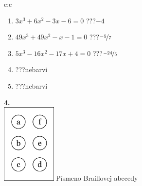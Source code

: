 \documentclass[10pt]{report}
\begin{document}
\begin{tabular}{c:c}
\begin{minipage}[c][104.5mm][t]{0.5\linewidth}
\begin{center}
\begin{minipage}{0.79\linewidth}
\begin{center}
\begin{varwidth}{\linewidth}
\begin{enumerate}
\item $3x^3+6x^2-3x-6=0$\quad \dotfill\; ???\;\dotfill \quad $-4$
\item $49x^3+49x^2-x-1=0$\quad \dotfill\; ???\;\dotfill \quad $\nicefrac{-5}{7}$
\item $5x^3-16x^2-17x+4=0$\quad \dotfill\; ???\;\dotfill \quad $\nicefrac{-24}{5}$
\item \quad \dotfill\; ???\;\dotfill \quad nebarvi
\item \quad \dotfill\; ???\;\dotfill \quad nebarvi
\end{enumerate}
\end{varwidth}
\end{center}
\end{minipage}
\begin{minipage}{0.20\linewidth}
\begin{center}
{\Huge\bfseries 4.} \\[2mm]
\includegraphics[height=40mm]{../images/braille.png}
{\small Písmeno Braillovej abecedy}
\end{center}
\end{minipage}
\end{center}
\end{minipage}
%
\end{tabular}
\newpage
\thispagestyle{empty}
\end{document}
